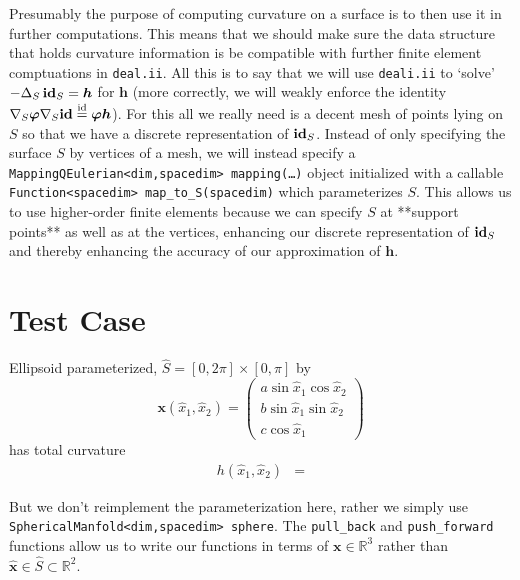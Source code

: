 \documentclass[10pt]{article}
\newcommand{\R}{\mathbb{R}}
\newcommand{\mbf}[1]{\boldsymbol{#1}}
\begin{document}
Presumably the purpose of computing curvature on a surface is to then use it in
further computations.  This means that we should make sure the data structure that holds
curvature information is be compatible with further finite element comptuations
in \texttt{deal.ii}.  All this is to say that we will use \texttt{deali.ii} to
`solve' $- \Delta_S \, \text{\bf id}_S = \mbf{h}$ for $\mbf{h}$ (more
correctly, we will weakly enforce the identity $\nabla_S \boldsymbol{\varphi}
\nabla_S \text{\bf id} \overset{\text{id}}{=} \mbf{\varphi}\mbf{h}$).  For this
all we really need is a decent mesh of points lying on $S$ so that we have a
discrete representation of $\text{\bf id}_S$.  Instead of only specifying the
surface $S$ by vertices of a mesh, we will instead specify a
\texttt{MappingQEulerian<dim,spacedim> mapping(\dots)} object initialized with a callable
\texttt{Function<spacedim> map\_to\_S(spacedim)} which parameterizes $S$.  This
allows us to use higher-order finite elements because we can specify $S$ at
**support points** as well as at the vertices, enhancing our discrete
representation of $\text{\bf id}_S$ and thereby enhancing the accuracy of our
approximation of $\mbf{h}$. 

\section*{Test Case}

Ellipsoid parameterized, $\hat{S} = [0,2\pi] \times [0, \pi]$ by 
\[  \mbf{x}(\hat{x}_1, \hat{x}_2) = 
   \left( \begin{array}{c} 
      a\sin \hat{x}_1 \cos \hat{x}_2 \\
      b\sin \hat{x}_1 \sin \hat{x}_2 \\
            c\cos\hat{x}_1 
   \end{array} \right)
\]
has total curvature 
\begin{align*}
   h(\hat{x}_1, \hat{x}_2) &= 
\end{align*}

But we don't reimplement the parameterization here, rather we simply use
\texttt{SphericalManfold<dim,spacedim> sphere}.  The \texttt{pull\_back} and
\texttt{push\_forward} functions allow us to write our functions in terms of
$\mbf{x} \in \R^3$ rather than $\hat{\mbf{x}} \in \hat{S} \subset \R^2$. 
\end{document}
